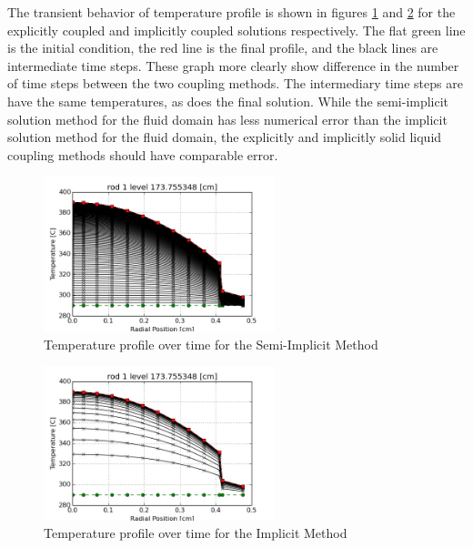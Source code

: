 The transient behavior of temperature profile is shown in figures
\ref{fig:profile_rod1_level_10_SI} and \ref{fig:profile_rod1_level_10_I} for
the explicitly coupled and implicitly coupled solutions respectively. The flat
green line is the initial condition, the red line is the final profile, and the
black lines are intermediate time steps. These graph more clearly show 
difference in the number of time steps between the two coupling methods. The
intermediary time steps are have the same temperatures, as does the final
solution. While the semi-implicit solution method for the fluid domain has less
numerical error than the implicit solution method for the fluid domain, the
explicitly and implicitly solid liquid coupling methods should have comparable
error.

\begin{figure}[!h]
	\centering
	\includegraphics[width=0.60\textwidth]{images/profile_rod1_level_10_SI.jpg}
	\caption{Temperature profile over time for the Semi-Implicit Method}
	\label{fig:profile_rod1_level_10_SI}
\end{figure}

\begin{figure}[!h]
	\centering
	\includegraphics[width=0.60\textwidth]{images/profile_rod1_level_10_I.jpg}
	\caption{Temperature profile over time for the Implicit Method}
	\label{fig:profile_rod1_level_10_I}
\end{figure}







